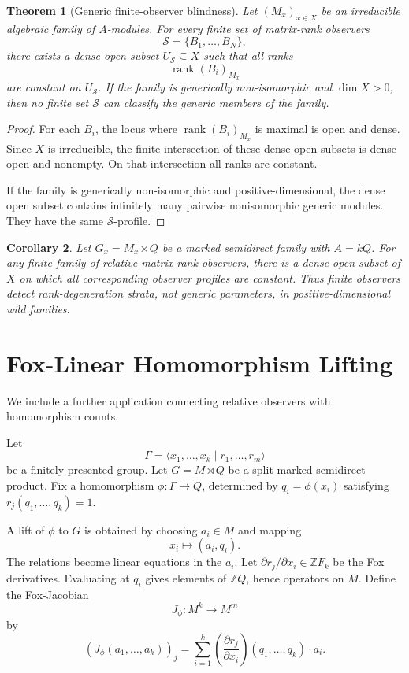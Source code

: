 \documentclass[11pt]{article}
\newtheorem{theorem}{Theorem}[section]
\newtheorem{corollary}[theorem]{Corollary}
\begin{document}
\begin{theorem}[Generic finite-observer blindness]
Let $(M_x)_{x\in X}$ be an irreducible algebraic family of $A$-modules. For every finite set of matrix-rank observers
\[
\mathcal S=\{B_1,\ldots,B_N\},
\]
there exists a dense open subset $U_{\mathcal S}\subseteq X$ such that all ranks
\[
\operatorname{rank}(B_i)_{M_x}
\]
are constant on $U_{\mathcal S}$. If the family is generically non-isomorphic and $\dim X>0$, then no finite set $\mathcal S$ can classify the generic members of the family.
\end{theorem}

\begin{proof}
For each $B_i$, the locus where $\operatorname{rank}(B_i)_{M_x}$ is maximal is open and dense. Since $X$ is irreducible, the finite intersection of these dense open subsets is dense open and nonempty. On that intersection all ranks are constant.

If the family is generically non-isomorphic and positive-dimensional, the dense open subset contains infinitely many pairwise nonisomorphic generic modules. They have the same $\mathcal S$-profile.
\end{proof}

\begin{corollary}
Let $G_x=M_x\rtimes Q$ be a marked semidirect family with $A=kQ$. For any finite family of relative matrix-rank observers, there is a dense open subset of $X$ on which all corresponding observer profiles are constant. Thus finite observers detect rank-degeneration strata, not generic parameters, in positive-dimensional wild families.
\end{corollary}

\section{Fox-Linear Homomorphism Lifting}

We include a further application connecting relative observers with homomorphism counts.

Let
\[
\Gamma=\langle x_1,\ldots,x_k\mid r_1,\ldots,r_m\rangle
\]
be a finitely presented group. Let $G=M\rtimes Q$ be a split marked semidirect product. Fix a homomorphism $\phi:\Gamma\to Q$, determined by $q_i=\phi(x_i)$ satisfying $r_j(q_1,\ldots,q_k)=1$.

A lift of $\phi$ to $G$ is obtained by choosing $a_i\in M$ and mapping
\[
x_i\mapsto (a_i,q_i).
\]
The relations become linear equations in the $a_i$. Let $\partial r_j/\partial x_i\in\mathbb ZF_k$ be the Fox derivatives. Evaluating at $q_i$ gives elements of $\mathbb ZQ$, hence operators on $M$. Define the Fox-Jacobian
\[
J_\phi:M^k\to M^m
\]
by
\[
(J_\phi(a_1,\ldots,a_k))_j
=
\sum_{i=1}^k
\left(\frac{\partial r_j}{\partial x_i}\right)(q_1,\ldots,q_k)\cdot a_i.
\]
\end{document}
